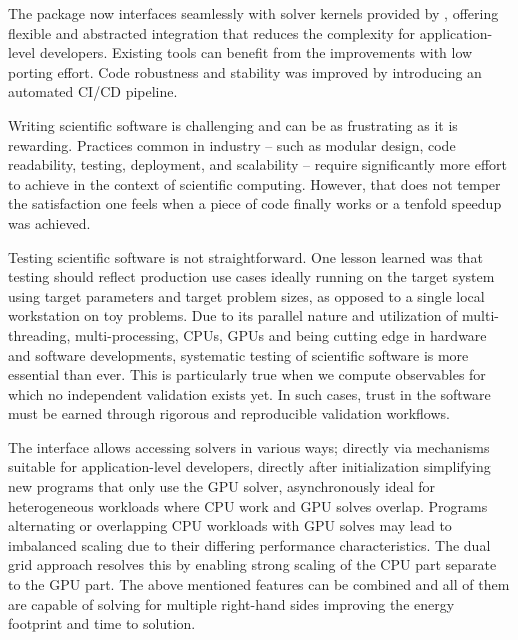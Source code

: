 The \openqxd package now interfaces seamlessly with solver kernels provided by \quda, offering flexible and abstracted integration that reduces the complexity for application-level developers.
Existing tools can benefit from the improvements with low porting effort.
Code robustness and stability was improved by introducing an automated CI/CD pipeline.

Writing scientific software is challenging and can be as frustrating as it is rewarding.
Practices common in industry -- such as modular design, code readability, testing, deployment, and scalability -- require significantly more effort to achieve in the context of scientific computing.
However, that does not temper the satisfaction one feels when a piece of code finally works or a tenfold speedup was achieved.

Testing scientific software is not straightforward.
One lesson learned was that testing should reflect production use cases ideally running on the target system using target parameters and target problem sizes, as opposed to a single local workstation on toy problems.
Due to its parallel nature and utilization of multi-threading, multi-processing, CPUs, GPUs and being cutting edge in hardware and software developments, systematic testing of scientific software is more essential than ever.
This is particularly true when we compute observables for which no independent validation exists yet.
In such cases, trust in the software must be earned through rigorous and reproducible validation workflows.

The interface allows accessing solvers in various ways; directly via \openqxd mechanisms suitable for application-level developers, directly after initialization simplifying new programs that only use the GPU solver, asynchronously ideal for heterogeneous workloads where CPU work and GPU solves overlap.
Programs alternating or overlapping CPU workloads with GPU solves may lead to imbalanced scaling due to their differing performance characteristics.
The dual grid approach resolves this by enabling strong scaling of the CPU part separate to the GPU part.
The above mentioned features can be combined and all of them are capable of solving for multiple right-hand sides improving the energy footprint and time to solution.

